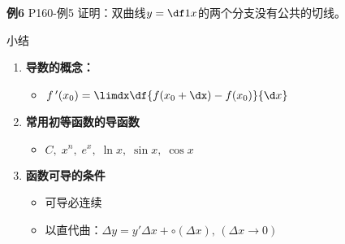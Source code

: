 \begin{frame}
	\linespread{1.2}
	\begin{exampleblock}{{\bf 例6} \hfill P160-例5}
		证明：双曲线$y=\df 1x$的两个分支没有公共的切线。
	\end{exampleblock}
\end{frame}

\begin{frame}[<+->]{小结}
	\linespread{1.5}
	\begin{enumerate}
	  \item {\bf 导数的概念：}
	  \begin{itemize}
	    \item $f\,'(x_0)=\limdx\df{f(x_0+\dx)-f(x_0)}{\d x}$
	  \end{itemize}
	  \item {\bf 常用初等函数的导函数}
	  \begin{itemize}
	    \item $C,\;x^n,\;e^x,\;\ln x,\;\sin x,\;\cos x$
	  \end{itemize}
	  \item {\bf 函数可导的条件}
	  \begin{itemize}
	    \item 可导必连续
	    \item 以直代曲：$\Delta y=y'\Delta x+\circ(\Delta x),\,(\Delta x\to 0)$
	  \end{itemize}
	\end{enumerate}
\end{frame}


